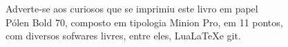 
\ifodd\thepage\blankpage\fi

\parindent=0pt
\footnotesize\thispagestyle{empty}

\newfontfamily{}

\mbox{}\vfill
\begin{center}
		\begin{minipage}{.7\textwidth}\tiny\noindent{}
		\centering\tiny\minion
		Adverte-se aos curiosos que se imprimiu este 
		livro em papel\\ 
		Pólen Bold 70, composto em tipologia Minion Pro, em 11 pontos,\\ 
		com diversos sofwares livres, 
		entre eles, Lua\LaTeX e git.\\ 
		\medskip\\\
		\end{minipage}
\end{center}